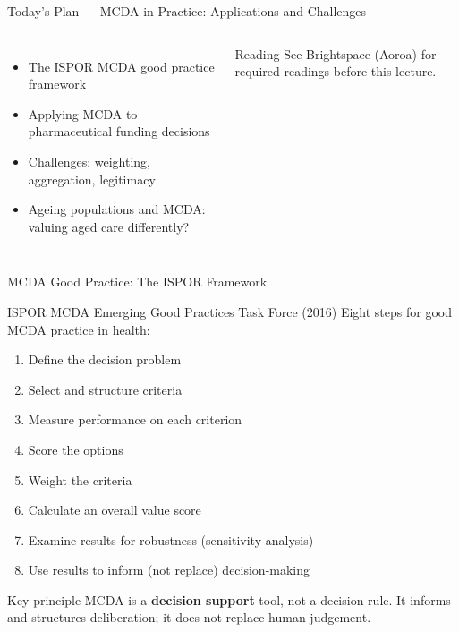 \documentclass[aspectratio=169, 12pt]{beamer}
\newcommand{\planslide}[2]{%
  \begin{frame}{Today's Plan — #1}
    \begin{columns}
      \column{0.6\textwidth}
      \begin{itemize}#2\end{itemize}
      \column{0.38\textwidth}
      \begin{alertblock}{Reading}
        \footnotesize See Brightspace (Aoroa) for required readings before this lecture.
      \end{alertblock}
    \end{columns}
  \end{frame}}
\begin{document}
\planslide{MCDA in Practice: Applications and Challenges}{
  \item The ISPOR MCDA good practice framework
  \item Applying MCDA to pharmaceutical funding decisions
  \item Challenges: weighting, aggregation, legitimacy
  \item Ageing populations and MCDA: valuing aged care differently?
}

\begin{frame}{MCDA Good Practice: The ISPOR Framework}
  \begin{block}{ISPOR MCDA Emerging Good Practices Task Force (2016)}
    Eight steps for good MCDA practice in health:
    \begin{enumerate}
      \item Define the decision problem
      \item Select and structure criteria
      \item Measure performance on each criterion
      \item Score the options
      \item Weight the criteria
      \item Calculate an overall value score
      \item Examine results for robustness (sensitivity analysis)
      \item Use results to inform (not replace) decision-making
    \end{enumerate}
  \end{block}
  \begin{alertblock}{Key principle}
    MCDA is a \textbf{decision support} tool, not a decision rule. It informs and structures
    deliberation; it does not replace human judgement.
  \end{alertblock}
\end{frame}
\end{document}
